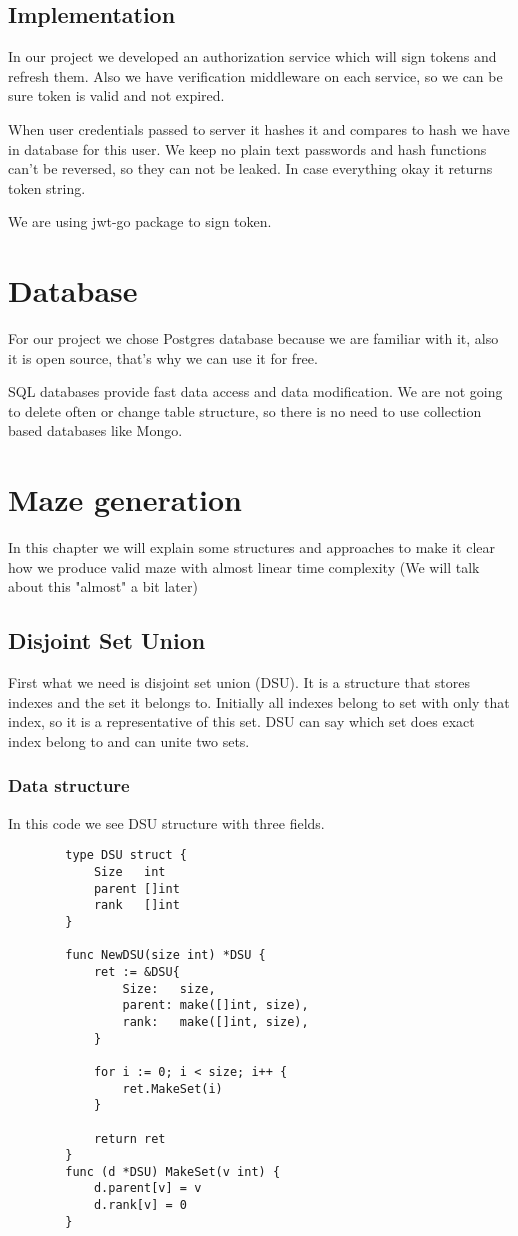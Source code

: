 	\subsection{Implementation}
	In our project we developed an authorization service which will sign tokens and refresh them. Also we have verification middleware on each service, so we can be sure token is valid and not expired.
	
		When user credentials passed to server it hashes it and compares to hash we have in database for this user. We keep no plain text passwords and hash functions can't be reversed, so they can not be leaked. In case everything okay it returns token string.
		
		We are using jwt-go package to sign token.
		
	
\section{Database}
	For our project we chose Postgres database because we are familiar with it, also it is open source, that's why we can use it for free.
	
	SQL databases provide fast data access and data modification. We are not going to delete often or change table structure, so there is no need to use collection based databases like Mongo.
	
\section{Maze generation}
	In this chapter we will explain some structures and approaches to make it clear how we produce valid maze with almost linear time complexity (We will talk about this "almost" a bit later)
	\subsection{Disjoint Set Union}
	First what we need is disjoint set union (DSU). It is a structure that stores indexes and the set it belongs to. Initially all indexes belong to set with only that index, so it is a representative of this set. DSU can say which set does exact index belong to and can unite two sets.
		\subsubsection{Data structure}
		In this code we see DSU structure with three fields. 

		\begin{lstlisting}
		type DSU struct {
			Size   int
			parent []int
			rank   []int
		}

		func NewDSU(size int) *DSU {
			ret := &DSU{
				Size:   size,
				parent: make([]int, size),
				rank:   make([]int, size),
			}

			for i := 0; i < size; i++ {
				ret.MakeSet(i)
			}

			return ret
		}
		func (d *DSU) MakeSet(v int) {
			d.parent[v] = v
			d.rank[v] = 0
		}
		\end{lstlisting}
		
